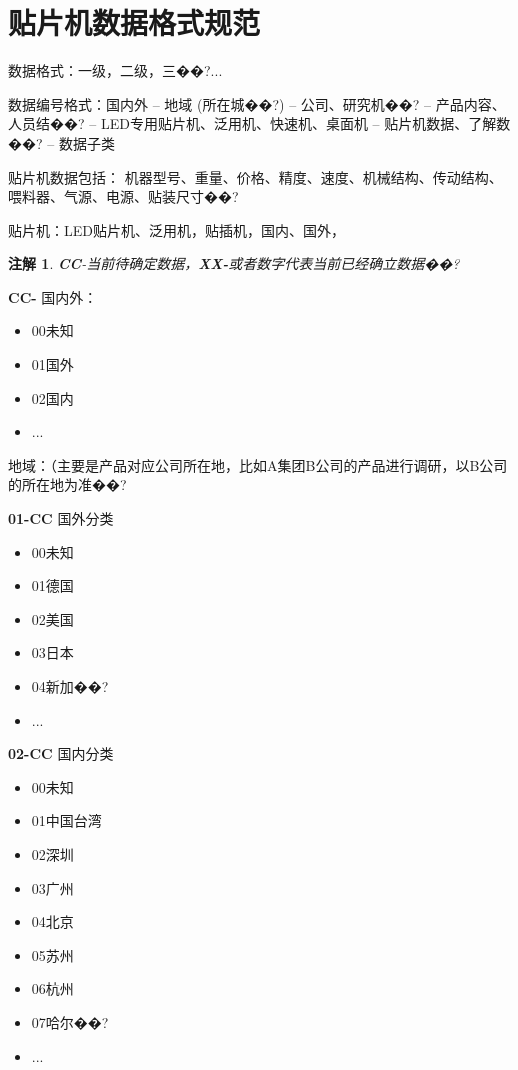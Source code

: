 \documentclass[a4paper,12pt]{article}
\newtheorem{remark}{注解}
\begin{document}
\section{贴片机数据格式规范}
数据格式：一级，二级，三��?...

数据编号格式：国内外 -- 地域 (所在城��?) -- 公司、研究机��? -- 产品内容、人员结��? -- LED专用贴片机、泛用机、快速机、桌面机 -- 贴片机数据、了解数��? -- 数据子类

贴片机数据包括：
机器型号、重量、价格、精度、速度、机械结构、传动结构、喂料器、气源、电源、贴装尺寸��?

贴片机：LED贴片机、泛用机，贴插机，国内、国外，

\begin{remark}
\textbf{CC}-当前待确定数据，\textbf{XX-}或者数字代表当前已经确立数据��?
\end{remark}

\textbf{{CC-}} 国内外：
\begin{itemize}
  \item 00未知%
  \item 01国外%
  \item 02国内%
  \item ...
\end{itemize}

地域：（主要是产品对应公司所在地，比如A集团B公司的产品进行调研，以B公司的所在地为准��?

\textbf{01-CC} 国外分类
\begin{itemize}
  \item 00未知%
  \item 01德国%
  \item 02美国%
  \item 03日本%
  \item 04新加��?
  \item ...
\end{itemize}

\textbf{02-CC} 国内分类
\begin{itemize}
  \item 00未知%
  \item 01中国台湾
  \item 02深圳
  \item 03广州
  \item 04北京
  \item 05苏州
  \item 06杭州
  \item 07哈尔��?
  \item ...
\end{itemize}
\end{document}
